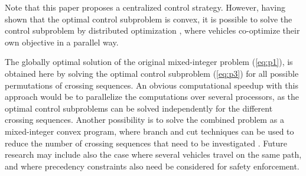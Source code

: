 \documentclass[letterpaper,10pt,conference]{ieeeconf}
\begin{document}
Note that this paper proposes  a centralized control strategy. However, having shown that the optimal control subproblem is convex, it is possible to solve the control subproblem by distributed optimization \cite{boyd11}, where vehicles co-optimize their own objective in a parallel way.

The globally optimal solution of the original mixed-integer problem (\ref{eq:p1}), is obtained here by solving the optimal control subproblem (\ref{eq:p3}) for all possible permutations of crossing sequences. An obvious computational speedup with this approach would be to parallelize the computations over several processors, as the optimal control subproblems can be solved independently for the different crossing sequences. Another possibility is to solve the combined problem as a mixed-integer convex program, where branch and cut techniques can be used to reduce the number of crossing sequences that need to be investigated \cite{sager09}. Future research may include also the case where several vehicles travel on the same path, and where precedency constraints also need  be considered for safety enforcement.




\end{document}
